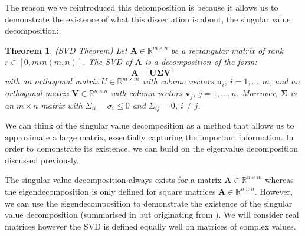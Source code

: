 \documentclass[a4paper,12pt]{article}
\newcommand{\matrx}[1]{\bm{#1}}
\newcommand{\vectr}[1]{\textbf{#1}}
\newcommand{\real}{\mathbb{R}}
\newtheorem{theorem}{Theorem}[section]
\begin{document}
	The reason we've reintroduced this decomposition is because it allows us to demonstrate the existence of what this dissertation is about, the singular value decomposition:
	\begin{theorem}(SVD Theorem) \cite[page 119]{mml_book}
		\normalfont Let $ \matrx{A} \in \real^{m \times n} $ be a rectangular matrix of rank $ r \in [0, min(m, n)] $. The SVD of $ \matrx{A} $ is a decomposition of the form:
		$$ \matrx{A} = \matrx{U} \matrx{\Sigma} \matrx{V}^{\top} $$
		with an orthogonal matrix $ U \in \real^{m \times m} $ with column vectors $ \vectr{u}_i $, $ i = 1, \ldots, m $, and an orthogonal matrix $ \matrx{V} \in \real^{n \times n} $ with column vectors $ \vectr{v}_j $, $ j = 1, \ldots, n $. Moreover, $ \matrx{\Sigma} $ is an $ m \times n $ matrix with $ \Sigma_{ii} = \sigma_i \leq 0 $ and $ \Sigma_{ij} = 0 $, $ i \ne j $. 
	\end{theorem}
	
	We can think of the singular value decomposition as a method that allows us to approximate a large matrix, essentially capturing the important information. In order to demonstrate its existence, we can build on the eigenvalue decomposition discussed previously. 
	
	The singular value decomposition always exists for a matrix $ \matrx{A} \in \real^{n \times m} $ whereas the eigendecomposition is only defined for square matrices $ \matrx{A} \in \real^{n \times n} $. However, we can use the eigendecomposition to demonstrate the existence of the singular value decomposition (summarised in \cite{gregorygundersenProofSingular} but originating from \cite{strang1993introduction}). We will consider real matrices however the SVD is defined equally well on matrices of complex values.
	
\end{document}
